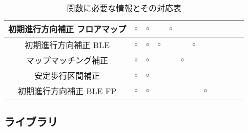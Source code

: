 \documentclass[Japanese]{abstruct}
\begin{document}
\begin{table*}[b]
{\begin{tabular}{|c|c|c|c|c|c|c|c|c|c|c|c|}
			初期進行方向補正 フロアマップ & \multicolumn{1}{c|}{$\circ$} & \multicolumn{1}{c|}{$\circ$} &                              & \multicolumn{1}{c|}{$\circ$} &                                                                                                               &                              &                              &                              &    &                              &    \\ \hline
			初期進行方向補正 BLE    & \multicolumn{1}{c|}{$\circ$} & \multicolumn{1}{c|}{$\circ$} & \multicolumn{1}{c|}{$\circ$} &                              &                                                                                                               & \multicolumn{1}{c|}{$\circ$} &                              &                              &    &                              &    \\ \hline
			マップマッチング補正      & \multicolumn{1}{c|}{$\circ$} & \multicolumn{1}{c|}{$\circ$} &                              &                              & \multicolumn{1}{c|}{$\circ$}                                                                                  &                              &                              &                              &    &                              &    \\ \hline
			安定歩行区間補正        & \multicolumn{1}{c|}{$\circ$} & \multicolumn{1}{c|}{$\circ$} &                              &                              &                                                                                                               &                              &                              &                              &    &                              &    \\ \hline
			初期進行方向補正 BLE FP & \multicolumn{1}{c|}{$\circ$} & \multicolumn{1}{c|}{$\circ$} &                              &                              &                                                                                                               &                              & \multicolumn{1}{c|}{$\circ$} &                              &    &                              &    \\ \hline
		\end{tabular}
	}
	\caption{関数に必要な情報とその対応表} \label{}
\end{table*}


\subsection{ライブラリ}
\end{document}
